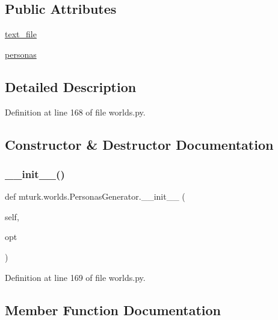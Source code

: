 \subsection*{Public Attributes}
\begin{DoxyCompactItemize}
\item 
\hyperlink{classmturk_1_1worlds_1_1PersonasGenerator_ad902f2de2a874e22ac1303f2e6463602}{text\+\_\+file}
\item 
\hyperlink{classmturk_1_1worlds_1_1PersonasGenerator_ab5887fcb26ad1a57f0bcdf304ad14be8}{personas}
\end{DoxyCompactItemize}


\subsection{Detailed Description}


Definition at line 168 of file worlds.\+py.



\subsection{Constructor \& Destructor Documentation}
\mbox{\label{classmturk_1_1worlds_1_1PersonasGenerator_afbf04f8f89fa447fb05f555d8eb259d8}} 
\subsubsection{\texorpdfstring{\+\_\+\+\_\+init\+\_\+\+\_\+()}{\_\_init\_\_()}}
{\footnotesize\ttfamily def mturk.\+worlds.\+Personas\+Generator.\+\_\+\+\_\+init\+\_\+\+\_\+ (\begin{DoxyParamCaption}\item[{}]{self,  }\item[{}]{opt }\end{DoxyParamCaption})}



Definition at line 169 of file worlds.\+py.



\subsection{Member Function Documentation}
\mbox{\label{classmturk_1_1worlds_1_1PersonasGenerator_a234e5189be03d1bf81f303f5a3dfac77}} 
